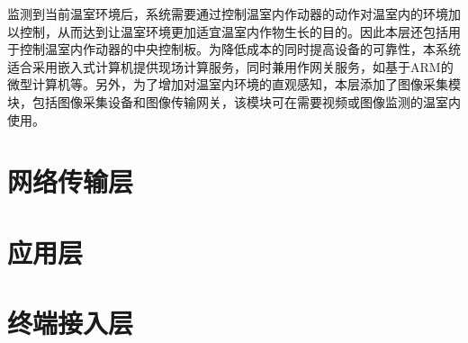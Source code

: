 监测到当前温室环境后，系统需要通过控制温室内作动器的动作对温室内的环境加以控制，从而达到让温室环境更加适宜温室内作物生长的目的。因此本层还包括用于控制温室内作动器的中央控制板。为降低成本的同时提高设备的可靠性，本系统适合采用嵌入式计算机提供现场计算服务，同时兼用作网关服务，如基于ARM的微型计算机等。另外，为了增加对温室内环境的直观感知，本层添加了图像采集模块，包括图像采集设备和图像传输网关，该模块可在需要视频或图像监测的温室内使用。
\section{网络传输层}

\section{应用层}

\section{终端接入层}
 
